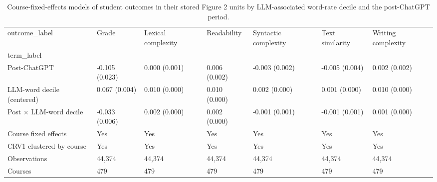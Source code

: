 \begin{table}
\caption{Course-fixed-effects models of student outcomes in their stored Figure 2 units by LLM-associated word-rate decile and the post-ChatGPT period.}
\label{tab:llm_decile_interactions_raw}
\begin{tabular}{lllllll}
\toprule
outcome_label & Grade & Lexical complexity & Readability & Syntactic complexity & Text similarity & Writing complexity \\
term_label &  &  &  &  &  &  \\
\midrule
Post-ChatGPT & -0.105
(0.023) & 0.000
(0.001) & 0.006
(0.002) & -0.003
(0.002) & -0.005
(0.004) & 0.002
(0.002) \\
LLM-word decile (centered) & 0.067
(0.004) & 0.010
(0.000) & 0.010
(0.000) & 0.002
(0.000) & 0.001
(0.000) & 0.010
(0.000) \\
Post × LLM-word decile & -0.033
(0.006) & 0.002
(0.000) & 0.002
(0.000) & -0.001
(0.001) & -0.001
(0.001) & 0.001
(0.000) \\
Course fixed effects & Yes & Yes & Yes & Yes & Yes & Yes \\
CRV1 clustered by course & Yes & Yes & Yes & Yes & Yes & Yes \\
Observations & 44,374 & 44,374 & 44,374 & 44,374 & 44,374 & 44,374 \\
Courses & 479 & 479 & 479 & 479 & 479 & 479 \\
\bottomrule
\end{tabular}
\end{table}
